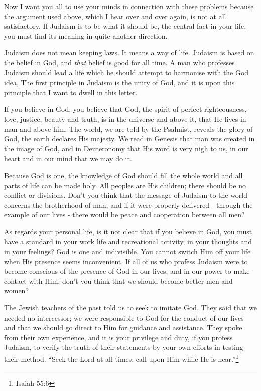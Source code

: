 Now I want you all to use your minds in connection
with these problems because the argument used above, which
I hear over and over again, is not at all satisfactory. If
Judaism is to be what it should be, the central fact in
your life, you must find its meaning in quite another
direction.

Judaism does not mean keeping laws. It means a way of
life. Judaism is based on the belief in God, and \textsl{that}
belief is good for all time. A man who professes Judaism
should lead a life which he should attempt to harmonise
with the God idea, The first principle in Judaism is the
unity of God, and it is upon this principle that I want to
dwell in this letter.

If you believe in God, you believe that God, the
spirit of perfect righteousness, love, justice, beauty and
truth, is in the universe and above it, that He lives in
man and above him. The world, we are told by the Psalmist,
reveals the glory of God, the earth declares His majesty.
We read in Genesis that man was created in the image of
God, and in Deuteronomy that His word is very nigh to us,
in our heart and in our mind that we may do it.

Because God is one, the knowledge of God should fill
the whole world and all parts of life can be made holy.
All peoples are His children; there should be no conflict
or divisions. Don't you think that the message of Judaism
to the world concerns the brotherhood of man, and if it
were properly delivered - through the example of our lives
- there would be peace and cooperation between all men?

As regards your personal life, is it not clear that if
you believe in God, you must have a standard in your work
life and recreational activity, in your thoughts and in
your feelings? God is one and indivisible. You cannot
switch Him off your life when His presence seems inconvenient.
If all of us who profess Judaism were to become
conscious of the presence of God in our lives, and in our
power to make contact with Him, don't you think that we
should become better men and women?

The Jewish teachers of the past told us to seek to
imitate God. They said that we needed no intercessor; we
were responsible to God for the conduct of our lives and
that we should go direct to Him for guidance and assistance.
They spoke from their own experience, and it is
your privilege and duty, if you profess Judaism, to verify
the truth of their statements by your own efforts in
testing their method. ``Seek the Lord at all times: call
upon Him while He is near.''\footnote{Isaiah 55:6}

